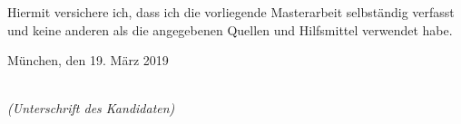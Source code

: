 %
%
%
%

\newpage

\thispagestyle{empty}

\begin{large}

\vspace*{2cm}

\noindent
Hiermit versichere ich, dass ich die vorliegende Masterarbeit
selbst\"andig verfasst und keine anderen als die angegebenen Quellen
und Hilfsmittel verwendet habe.

\vspace{2cm}

\noindent
M\"unchen, den 19. M\"arz 2019

\vspace{3cm}

\hspace*{7cm}%
\dotfill\\
\hspace*{8.5cm}%
\textit{(Unterschrift des Kandidaten)}

\end{large}
